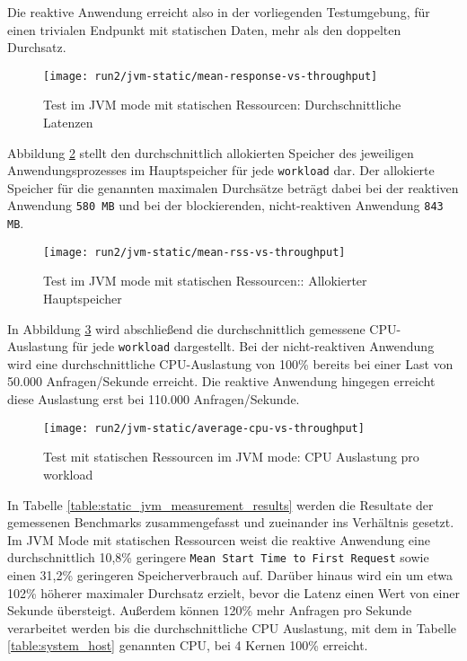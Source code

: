 Die reaktive Anwendung erreicht also in der vorliegenden Testumgebung, für einen trivialen
Endpunkt mit statischen Daten, mehr als den doppelten Durchsatz.
\newpage
\begin{figure}[ht!]
  \texttt{[image: run2/jvm-static/mean-response-vs-throughput]}
  \caption{Test im JVM mode mit statischen Ressourcen: Durchschnittliche Latenzen}
  \label{fig:jvm_static_mean_response}
\end{figure}
Abbildung \ref{fig:jvm_static_mean_rss} stellt den durchschnittlich allokierten Speicher des jeweiligen Anwendungsprozesses
im Hauptspeicher für jede \verb|workload| dar. Der allokierte Speicher für die genannten maximalen Durchsätze beträgt dabei bei
der reaktiven Anwendung \verb|580 MB| und bei der blockierenden, nicht-reaktiven Anwendung \verb|843 MB|.
\newpage
\begin{figure}[ht!]
  \texttt{[image: run2/jvm-static/mean-rss-vs-throughput]}
  \caption{Test im JVM mode mit statischen Ressourcen:: Allokierter Hauptspeicher}
  \label{fig:jvm_static_mean_rss}
\end{figure}
In Abbildung \ref{fig:jvm_static_avg_cpu} wird abschließend die durchschnittlich gemessene CPU-Auslastung für jede \verb|workload|
dargestellt. Bei der nicht-reaktiven Anwendung wird eine durchschnittliche CPU-Auslastung von 100\% bereits bei einer Last von
50.000 Anfragen/Sekunde erreicht. Die reaktive Anwendung hingegen erreicht diese Auslastung erst bei 110.000 Anfragen/Sekunde.
\newpage
\begin{figure}[ht!]
  \centering
  \texttt{[image: run2/jvm-static/average-cpu-vs-throughput]}
  \caption{Test mit statischen Ressourcen im JVM mode: CPU Auslastung pro workload}
  \label{fig:jvm_static_avg_cpu}
\end{figure}

In Tabelle \ref{table:static_jvm_measurement_results} werden die Resultate der gemessenen Benchmarks zusammengefasst
und zueinander ins Verhältnis gesetzt.
Im JVM Mode mit statischen Ressourcen weist die reaktive Anwendung eine durchschnittlich 10,8\% geringere \verb|Mean Start Time to First Request|
sowie einen 31,2\% geringeren Speicherverbrauch auf.
Darüber hinaus wird ein um etwa 102\% höherer maximaler Durchsatz erzielt, bevor die Latenz einen Wert von einer Sekunde übersteigt.
Außerdem können 120\% mehr Anfragen pro Sekunde verarbeitet werden bis die durchschnittliche CPU Auslastung, mit dem in Tabelle
\ref{table:system_host} genannten CPU, bei 4 Kernen 100\% erreicht.

